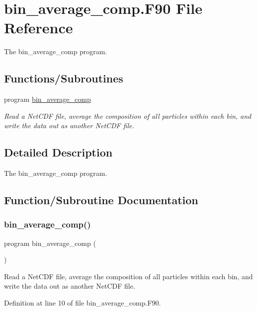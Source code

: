 \hypertarget{bin__average__comp_8_f90}{}\section{bin\+\_\+average\+\_\+comp.\+F90 File Reference}
\label{bin__average__comp_8_f90}


The bin\+\_\+average\+\_\+comp program.  


\subsection*{Functions/\+Subroutines}
\begin{DoxyCompactItemize}
\item 
program \mbox{\hyperlink{bin__average__comp_8_f90_a1b07774cc8c4806b9e619af9d5b94b68}{bin\+\_\+average\+\_\+comp}}
\begin{DoxyCompactList}\small\item\em Read a Net\+C\+DF file, average the composition of all particles within each bin, and write the data out as another Net\+C\+DF file. \end{DoxyCompactList}\end{DoxyCompactItemize}


\subsection{Detailed Description}
The bin\+\_\+average\+\_\+comp program. 



\subsection{Function/\+Subroutine Documentation}
\mbox{\label{bin__average__comp_8_f90_a1b07774cc8c4806b9e619af9d5b94b68}} 
\subsubsection{\texorpdfstring{bin\+\_\+average\+\_\+comp()}{bin\_average\_comp()}}
{\footnotesize\ttfamily program bin\+\_\+average\+\_\+comp (\begin{DoxyParamCaption}{ }\end{DoxyParamCaption})}



Read a Net\+C\+DF file, average the composition of all particles within each bin, and write the data out as another Net\+C\+DF file. 



Definition at line 10 of file bin\+\_\+average\+\_\+comp.\+F90.

